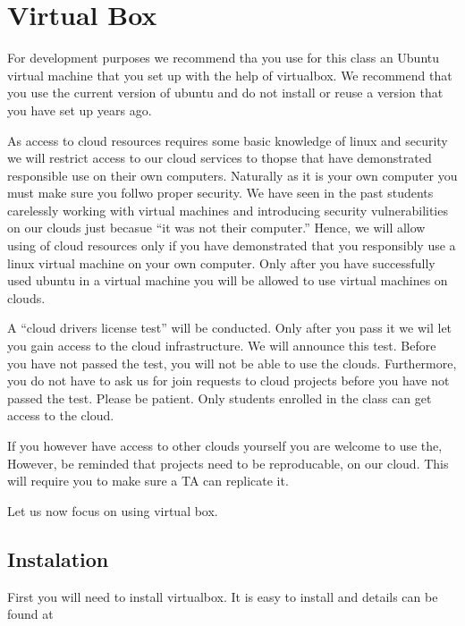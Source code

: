 \chapter{Virtual Box}
\label{S:virtual-box}

\FILENAME

For development purposes we recommend tha you use for this class an
Ubuntu virtual machine that you set up with the help of virtualbox. We
recommend that you use the current version of ubuntu and do not
install or reuse a version that you have set up years ago.

As access to cloud resources requires some basic knowledge of linux
and security we will restrict access to our cloud services to thopse
that have demonstrated responsible use on their own
computers. Naturally as it is your own computer you must make sure you
follwo proper security. We have seen in the past students carelessly
working with virtual machines and introducing security vulnerabilities
on our clouds just becasue ``it was not their computer.'' Hence, we
will allow using of cloud resources only if you have demonstrated that
you responsibly use a linux virtual machine on your own computer.
Only after you have successfully used ubuntu in a virtual machine you
will be allowed to use virtual machines on clouds.

A ``cloud drivers license test'' will be conducted. Only after you
pass it we wil let you gain access to the cloud infrastructure. We
will announce this test. Before you have not passed the test, you will
not be able to use the clouds.  Furthermore, you do not have to ask us
for join requests to cloud projects before you have not passed the
test. Please be patient. Only students enrolled in the class can get
access to the cloud. 

If you however have access to other clouds yourself you are welcome to
use the, However, be reminded that projects need to be reproducable,
on our cloud. This will require you to make sure a TA can replicate it.

Let us now focus on using virtual box.

\section{Instalation}\label{creation}

First you will need to install virtualbox. It is easy to install and
details can be found at


